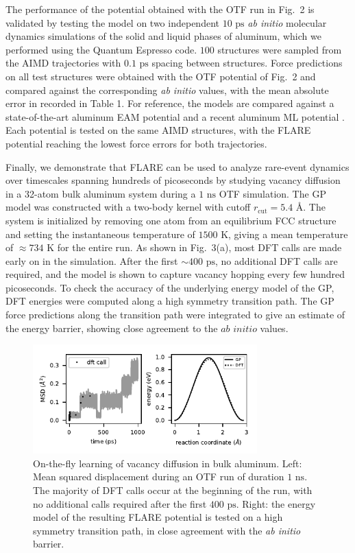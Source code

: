 \documentclass[%
reprint,
superscriptaddress,
amsmath,amssymb,
aps,
prl,
]{revtex4-1}
\begin{document}
The performance of the potential obtained with the OTF run in Fig.\ 2 is validated by testing the model on two independent $10 \text{ ps}$ \textit{ab initio} molecular dynamics simulations of the solid and liquid phases of aluminum, which we performed using the Quantum Espresso code. $100$ structures were sampled from the AIMD trajectories with $0.1 \text{ ps}$ spacing between structures. Force predictions on all test structures were obtained with the OTF potential of Fig.\ 2 and compared against the corresponding \textit{ab initio} values, with the mean absolute error in  recorded in Table 1. For reference, the models are compared against a state-of-the-art aluminum EAM potential \cite{sheng2011highly} and a recent aluminum ML potential \cite{botu2016machine}. Each potential is tested on the same AIMD structures, with the FLARE potential reaching the lowest force errors for both trajectories.

Finally, we demonstrate that FLARE can be used to analyze rare-event dynamics over timescales spanning hundreds of picoseconds by studying vacancy diffusion in a 32-atom bulk aluminum system during a $1 \text{ ns}$ OTF simulation. The GP model was constructed with a two-body kernel with cutoff $r_{\text{cut}} = 5.4 \text{ \AA}$. The system is initialized by removing one atom from an equilibrium FCC structure and setting the instantaneous temperature of $1500 \text{ K}$, giving a mean temperature of $\approx 734 \text{ K}$ for the entire run. As shown in Fig.\ 3(a), most DFT calls are made early on in the simulation. After the first $\sim 400 \text{ ps}$, no additional DFT calls are required, and the model is shown to capture vacancy hopping every few hundred picoseconds. To check the accuracy of the underlying energy model of the GP, DFT energies were computed along a high symmetry transition path. The GP force predictions along the transition path were integrated to give an estimate of the energy barrier, showing close agreement to the $\textit{ab initio}$ values.

\begin{figure}
	\centering
	\includegraphics[width=3.41in]{vac.pdf}
	\caption{On-the-fly learning of vacancy diffusion in bulk aluminum. Left: Mean squared displacement during an OTF run of duration $1 \text{ ns}$. The majority of DFT calls occur at the beginning of the run, with no additional calls required after the first $400 \text{ ps}$. Right: the energy model of the resulting FLARE potential is tested on a high symmetry transition path, in close agreement with the \textit{ab initio} barrier.}
\end{figure}
\end{document}
